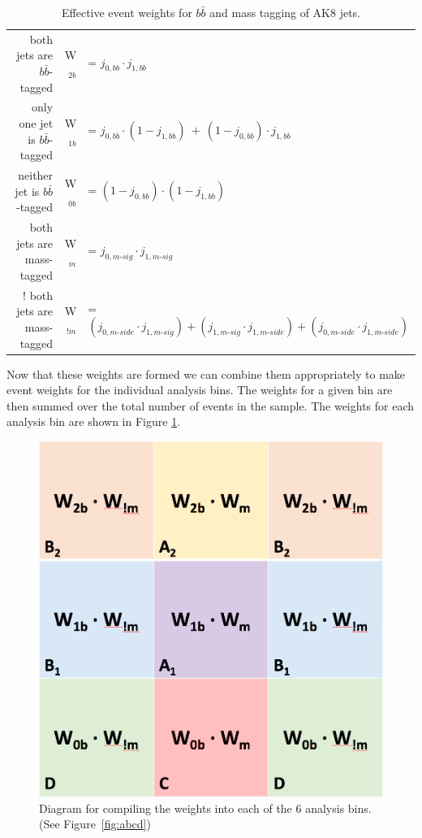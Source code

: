\begin{table}[hbp!]
\caption{Effective event weights for $b\bar{b}$ and mass tagging of AK8 jets.}
\label{tab:evtwht}
\begin{tabular}{rrl}
\hline\hline
both jets are $b\bar{b}$-tagged & W$_{2b}$ & = $j_{0, b{b}} \cdot j_{1, b{b}}$\\
only one jet is $b\bar{b}$-tagged & W$_{1b}$ & = $j_{0, b{b}} \cdot ( 1 - j_{1, b{b}} ) ~+~ ( 1 - j_{0, b{b}} ) \cdot j_{1, b{b}}$\\
neither jet is $b\bar{b}$-tagged & W$_{0b}$ & = $( 1 - j_{0, bb} ) \cdot ( 1 - j_{1, b{b}} )$\\
both jets are mass-tagged & W$_{m}$ & = $j_{0, m\text{-}sig} \cdot j_{1,m\text{-}sig}$\\
! both jets are mass-tagged & W$_{!m}$ & = $(j_{0, m\text{-}side} \cdot j_{1, m\text{-}sig}) + (j_{1, m\text{-}sig} \cdot j_{1, m\text{-}side}) + (j_{0, m\text{-}side} \cdot j_{1, m\text{-}side})$\\
\hline\hline
\end{tabular}
\end{table}

Now that these weights are formed we can combine them appropriately to make event weights for the individual analysis bins. The weights for a given bin are then summed over the total number of events in the sample. The weights for each analysis bin are shown in Figure \ref{fig:wdiag}.

\begin{figure}[hbp!]
\centering
\includegraphics[width=0.4\linewidth]{figs/weights.png}
\caption[Diagram for compiling the weights into each of the 6 analysis bins.]{Diagram for compiling the weights into each of the 6 analysis bins. (See Figure~\ref{fig:abcd})}
\label{fig:wdiag}
\end{figure}


